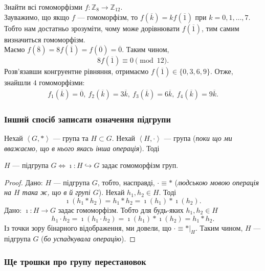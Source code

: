 \documentclass{math_library}
\begin{document}
\begin{example}
Знайти всі гомоморфізми $f \colon \mathbb{Z}_8 \to \mathbb{Z}_{12}$.
\bigskip \\
Зауважимо, що якщо $f$ --- гомоморфізм, то $f(\overline{k}) = k f(\overline{1})$ при $k = 0,1,\dots,7$. Тобто нам достатньо зрозуміти, чому може дорівнювати $f(\overline{1})$, тим самим визначиться гомоморфізм.\\
Маємо $f(\overline{8}) = 8 f(\overline{1}) = f(\overline{0}) = \overline{0}$. Таким чином, 
\[8 f(\overline{1}) \equiv 0 \pmod{12}.\]
Розв'язавши конгруентне рівняння, отримаємо $f(\overline{1}) \in \{ 0,3,6,9 \}$. Отже, знайшли $4$ гомоморфізми:
\begin{align*}
f_1(\overline{k}) = \overline{0},\ f_2(\overline{k}) = 3\overline{k},\ f_3(\overline{k}) = 6 \overline{k},\ f_4(\overline{k}) = 9 \overline{k}.
\end{align*}
\end{example}

\subsubsection*{Інший спосіб записати означення підгрупи}
\begin{proposition}
Нехай $\left< G,*\right>$ --- група та $H \subset G$. Нехай $\left<H,\cdot\right>$ --- група (\textit{поки що ми вважаємо, що в нього якась інша операція}). Тоді
\begin{center}
$H$ --- підгрупа $G \iff \imath \colon H \hookrightarrow G$ задає гомоморфізм груп.
\end{center}
\end{proposition}

\begin{proof}
\rightproof Дано: $H$ --- підгрупа $G$, тобто, насправді, $\cdot \equiv *$ (\textit{людською мовою операція на $H$ така ж, що в й групі $G$}). Нехай $h_1,h_2 \in H$. Тоді 
\[
\imath (h_1 * h_2) = h_1 * h_2 = \imath(h_1) * \imath(h_2).
\]
\leftproof Дано: $\imath \colon H \to G$ задає гомоморфізм. Тобто для будь-яких $h_1,h_2 \in H$
\[
h_1 \cdot h_2 = \imath(h_1 \cdot h_2) = \imath(h_1) * \imath(h_2) = h_1 * h_2. \]
Із точки зору бінарного відображення, ми довели, що $\cdot \equiv *|_H$. Таким чином, $H$ --- підгрупа $G$ (\textit{бо успадкувала операцію}).
\end{proof}

\iffalse
\subsubsection*{Ще трошки про групу перестановок}
\end{document}
